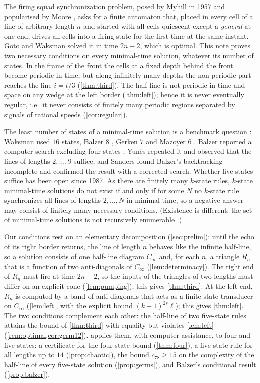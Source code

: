 \documentclass[3p]{elsarticle}
\theoremstyle{remark}
\begin{document}
The firing squad synchronization problem, posed by Myhill in 1957 and
popularised by Moore \cite{Moore64}, asks for a finite automaton that, placed
in every cell of a line of arbitrary length $n$ and started with all cells
quiescent except a \emph{general} at one end, drives all cells into a firing
state for the first time at the same instant. Goto \cite{Goto62} and Waksman
\cite{Waksman66} solved it in time $2n-2$, which is optimal. This note proves
two necessary conditions on every minimal-time solution, whatever its number
of states. In the frame of the front the cells at a fixed depth behind the
front become periodic in time, but along infinitely many depths the
non-periodic part reaches the line $i=t/3$ (\cref{thm:third}). The half-line
is not periodic in time and space on any wedge at the left border
(\cref{thm:left}); hence it is never eventually regular, i.e.\ it never
consists of finitely many periodic regions separated by signals of rational
speeds (\cref{cor:regular}).

The least number of states of a minimal-time solution is a benchmark question
\cite{Umeo09,Correa17}: Waksman used $16$ states, Balzer $8$ \cite{Balzer67},
Gerken $7$ \cite{Gerken87} and Mazoyer $6$ \cite{Mazoyer87}. Balzer reported a
computer search excluding four states \cite{Balzer67}; Yun\`es \cite{Yunes93}
repeated it and observed that the lines of lengths $2,\dots,9$ suffice, and
Sanders \cite{Sanders94} found Balzer's backtracking incomplete and confirmed
the result with a corrected search. Whether five states suffice has been open
since 1987. As there are finitely many $k$-state rules, $k$-state minimal-time
solutions do not exist if and only if for some $N$ no $k$-state rule
synchronizes all lines of lengths $2,\dots,N$ in minimal time, so a negative
answer may consist of finitely many necessary conditions. (Existence is
different: the set of minimal-time solutions is not recursively enumerable
\cite{Mazoyer96}.)

Our conditions rest on an elementary decomposition (\cref{sec:prelim}): until
the echo of its right border returns, the line of length $n$ behaves like the
infinite half-line, so a solution consists of one half-line diagram $C_\infty$
and, for each $n$, a triangle $R_n$ that is a function of two anti-diagonals of
$C_\infty$ (\cref{lem:determinacy}). The right end of $R_n$ must fire at time
$2n-2$, so the inputs of the triangles of two lengths must differ on an
explicit cone (\cref{lem:pumping}); this gives \cref{thm:third}. At the left
end, $R_n$ is computed by a band of anti-diagonals that acts as a finite-state
transducer on $C_\infty$ (\cref{lem:left}, with the explicit bound
$(k-1)^{2s}\ell$); this gives \cref{thm:left}. The two conditions complement
each other: the half-line of two five-state rules attains the bound of
\cref{thm:third} with equality but violates \cref{lem:left}
(\cref{rem:optimal,cor:germ12}).  applies them, with
computer assistance, to four and five states: a certificate for the four-state
bound (\cref{thm:four}), a five-state rule for all lengths up to $14$
(\cref{prop:chaotic}), the bound $c_{78}\ge15$ on the complexity of the
half-line of every five-state solution (\cref{prop:germs}), and Balzer's
conditional result (\cref{prop:balzer}).
\end{document}
